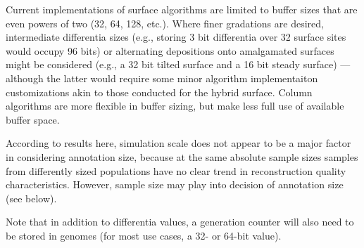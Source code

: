 \begin{itemize}
  Current implementations of surface algorithms are limited to buffer sizes that are even powers of two (32, 64, 128, etc.).
  Where finer gradations are desired, intermediate differentia sizes (e.g., storing 3 bit differentia over 32 surface sites would occupy 96 bits) or alternating depositions onto amalgamated surfaces might be considered (e.g., a 32 bit tilted surface and a 16 bit steady surface) --- although the latter would require some minor algorithm implementaiton customizations akin to those conducted for the hybrid surface.
  Column algorithms are more flexible in buffer sizing, but make less full use of available buffer space.

  According to results here, simulation scale does not appear to be a major factor in considering annotation size, because at the same absolute sample sizes samples from differently sized populations have no clear trend in reconstruction quality characteristics.
  However, sample size may play into decision of annotation size (see below).

  Note that in addition to differentia values, a generation counter will also need to be stored in genomes (for most use cases, a 32- or 64-bit value).


\end{itemize}
